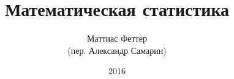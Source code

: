 \documentclass[a4paper,11pt]{book}
\theoremstyle{plain}
\theoremstyle{definition}
\begin{document}
	
\author{Маттиас Феттер \\
	(пер. Александр Самарин)}
\title{Математическая статистика}
\date{2016}

\frontmatter
\maketitle
\tableofcontents

\mainmatter









\backmatter



\end{document}
